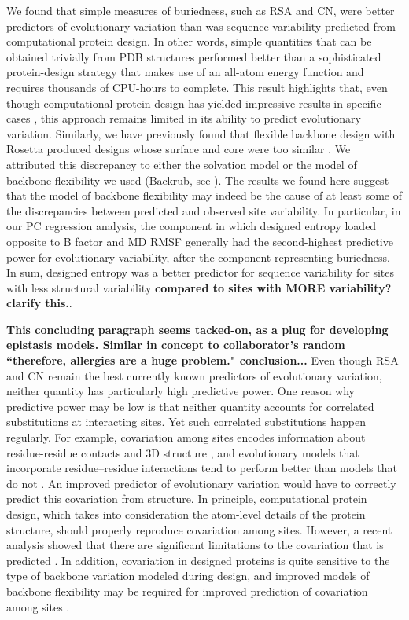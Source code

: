 \documentclass[smallextended]{svjour3}
\begin{document}
We found that simple measures of buriedness, such as RSA and CN, were better predictors of evolutionary variation than was sequence variability predicted from computational protein design. In other words, simple quantities that can be obtained trivially from PDB structures performed better than a sophisticated protein-design strategy that makes use of an all-atom energy function and requires thousands of CPU-hours to complete. This result highlights that, even though computational protein design has yielded impressive results in specific cases \citep{Kuhlman2003,Rothlisberger2008,Fleishman2011}, this approach remains limited in its ability to predict evolutionary variation. Similarly, we have previously found that flexible backbone design with Rosetta produced designs whose surface and core were too similar \citep{Jacksonetal2013}. We attributed this discrepancy to either the solvation model or the model of backbone flexibility we used (Backrub, see \citealt{Smith2008}). The results we found here suggest that the model of backbone flexibility may indeed be the cause of at least some of the discrepancies between predicted and observed site variability. In particular, in our PC regression analysis, the component in which designed entropy loaded opposite to B factor and MD RMSF generally had the second-highest predictive power for evolutionary variability, after the component representing buriedness. In sum, designed entropy was a better predictor for sequence variability for sites with less structural variability \textbf{compared to sites with MORE variability? clarify this.}.

\textbf{This concluding paragraph seems tacked-on, as a plug for developing epistasis models. Similar in concept to collaborator's random ``therefore, allergies are a huge problem." conclusion...}
Even though RSA and CN remain the best currently known predictors of evolutionary variation, neither quantity has particularly high predictive power. One reason why predictive power may be low is that neither quantity accounts for correlated substitutions at interacting sites.  Yet such correlated substitutions happen regularly. For example, covariation among sites encodes information about residue-residue contacts and 3D structure \citep{Halabietal2009,BurgervanNimwegen2010,Marksetal2011,Jonesetal2014}, and evolutionary models that incorporate residue--residue interactions tend to perform better than models that do not \citep{Rodrigueetal2005,BordnerMittelmann2014}. An improved predictor of evolutionary variation would have to correctly predict this covariation from structure. In principle, computational protein design, which takes into consideration the atom-level details of the protein structure, should properly reproduce covariation among sites. However, a recent analysis showed that there are significant limitations to the covariation that is predicted \citep{OllikainenKortemme2013}. In addition, covariation in designed proteins is quite sensitive to the type of backbone variation modeled during design, and improved models of backbone flexibility may be required for improved prediction of covariation among sites \citep{OllikainenKortemme2013}.
\end{document}
